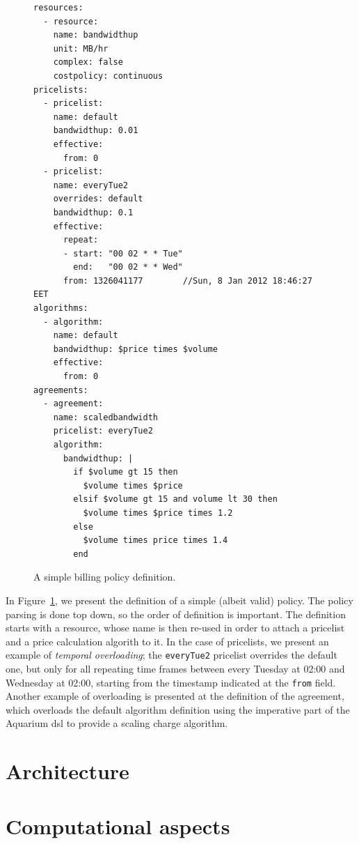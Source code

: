 \documentclass[letterpaper,twocolumn,10pt]{article}
\begin{document}
\begin{figure}
\lstset{language=c, basicstyle=\footnotesize,
stringstyle=\ttfamily, 
flexiblecolumns=true, aboveskip=-0.9em, belowskip=0em, lineskip=0em}

\begin{lstlisting}
resources:
  - resource:
    name: bandwidthup
    unit: MB/hr
    complex: false
    costpolicy: continuous
pricelists:
  - pricelist: 
    name: default
    bandwidthup: 0.01
    effective:
      from: 0
  - pricelist: 
    name: everyTue2
    overrides: default
    bandwidthup: 0.1
    effective:
      repeat:
      - start: "00 02 * * Tue"
        end:   "00 02 * * Wed"
      from: 1326041177        //Sun, 8 Jan 2012 18:46:27 EET
algorithms:
  - algorithm:
    name: default
    bandwidthup: $price times $volume
    effective:
      from: 0
agreements:
  - agreement:
    name: scaledbandwidth
    pricelist: everyTue2
    algorithm:
      bandwidthup: |
        if $volume gt 15 then
          $volume times $price
        elsif $volume gt 15 and volume lt 30 then
          $volume times $price times 1.2
        else
          $volume times price times 1.4
        end
\end{lstlisting}
\caption{A simple billing policy definition.} 
\label{fig:dsl}
\end{figure}

In Figure~\ref{fig:dsl}, we present the definition of a simple (albeit valid) 
policy. The policy parsing is done top down, so the order of definition 
is important. The definition starts with a resource, whose name is then
re-used in order to attach a pricelist and a price calculation algorith to it.
In the case of pricelists, we present an example of \emph{temporal overloading};
the \texttt{everyTue2} pricelist overrides the default one, but only for 
all repeating time frames between every Tuesday at 02:00 and Wednesday at
02:00, starting from the timestamp indicated at the \texttt{from} field. Another
example of overloading is presented at the definition of the agreement, which
overloads the default algorithm definition using the imperative part of the
Aquarium {\sc dsl} to provide a scaling charge algorithm.

\section{Architecture}


\section{Computational aspects}
\end{document}

